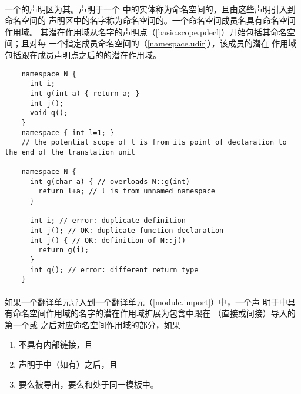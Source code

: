 \paragraph{} %
一个的声明区为其。声明于一个
中的实体称为命名空间的，且由这些声明引入到命名空间的
声明区中的名字称为命名空间的。一个命名空间成员名具有命名空间作用域。
其潜在作用域从名字的声明点（\ref{basic.scope.pdecl}）开始包括其命名空间；且对每
一个指定成员命名空间的（\ref{namespace.udir}），该成员的潜在
作用域包括跟在成员声明点之后的的潜在作用域。

\begin{example}
  \begin{lstlisting}
    namespace N {
      int i;
      int g(int a) { return a; }
      int j();
      void q();
    }
    namespace { int l=1; }
    // the potential scope of l is from its point of declaration to the end of the translation unit

    namespace N {
      int g(char a) { // overloads N::g(int)
        return l+a; // l is from unnamed namespace
      }

      int i; // error: duplicate definition
      int j(); // OK: duplicate function declaration
      int j() { // OK: definition of N::j()
        return g(i);
      }
      int q(); // error: different return type
    }
  \end{lstlisting}
\end{example}

\paragraph{} %
如果一个翻译单元导入到一个翻译单元（\ref{module.import}）中，一个声
明于中具有命名空间作用域的名字的潜在作用域扩展为包含中跟在
（直接或间接）导入的第一个或
之后对应命名空间作用域的部分，如果
\begin{enumerate}
  \item {}不具有内部链接，且
  \item {}声明于中（如有）之后，且
  \item 要么被导出，要么和处于同一模板中。
\end{enumerate}

